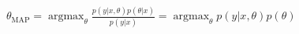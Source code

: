 \begin{answer}
$\theta_{\text{MAP}} = \operatorname*{argmax}_\theta  \frac{p(y|x, \theta)p(\theta|x)}{p(y|x)} = \operatorname*{argmax}_\theta  p(y|x, \theta)p(\theta)$
\end{answer}
